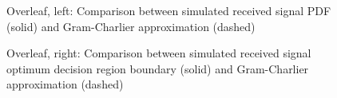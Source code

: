 \begin{figure}[htbp]
\caption[Received signal PDF: Gram-Charlier approximation vs simulation]{Overleaf, left: Comparison between simulated received signal PDF (solid) and Gram-Charlier approximation (dashed)}
\end{figure}

{
\setlength{\floatsep}{2pt plus 1.0pt minus 2.0pt}
\setlength{\textfloatsep}{2pt plus 1.0pt minus 2.0pt}
\setlength{\intextsep}{2pt plus 1.0pt minus 2.0pt}
\begin{figure}[htbp]
\caption[Received signal optimum DRB: Gram-Charlier approximation vs simulation]{Overleaf, right: Comparison between simulated received signal optimum decision region boundary (solid) and Gram-Charlier approximation (dashed)}
\end{figure}
}

